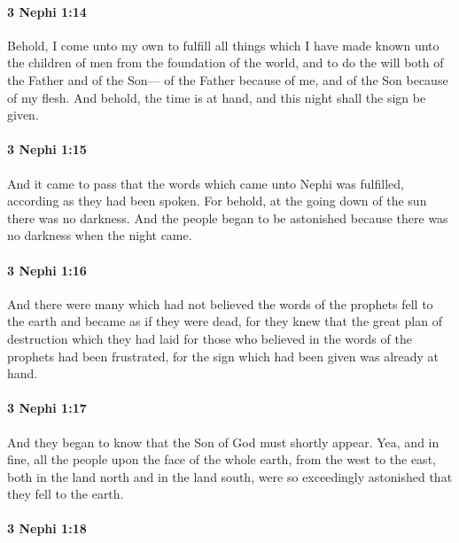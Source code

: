 		\paragraph{3 Nephi 1:14} %
			\label{3NEPHI-1-14}

			Behold, I come unto my own
			to fulfill all things which I have made known unto the children of men
			from the foundation of the world,
			and to do the will both of the Father and of the Son---
			of the Father because of me,
			and of the Son because of my flesh.
			And behold, the time is at hand,
			and this night shall the sign be given.

		\paragraph{3 Nephi 1:15} %
			\label{3NEPHI-1-15}

			And it came to pass that the words which came unto Nephi was fulfilled,
			according as they had been spoken.
			For behold, at the going down of the sun there was no darkness.
			And the people began to be astonished
			because there was no darkness when the night came.

		\paragraph{3 Nephi 1:16} %
			\label{3NEPHI-1-16}

			And there were many which had not believed the words of the prophets
			fell to the earth and became as if they were dead,
			for they knew that the great plan of destruction
			which they had laid for those who believed in the words of the prophets
			had been frustrated,
			for the sign which had been given was already at hand.

		\paragraph{3 Nephi 1:17} %
			\label{3NEPHI-1-17}

			And they began to know that the Son of God must shortly appear.
			Yea, and in fine, all the people upon the face of the whole earth,
			from the west to the east,
			both in the land north and in the land south,
			were so exceedingly astonished that they fell to the earth.

		\paragraph{3 Nephi 1:18} %
			\label{3NEPHI-1-18}

